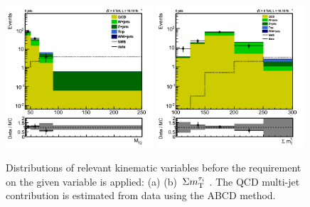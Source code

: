 \begin{figure}[htbp]
\centering
\includegraphics[width=0.49\textwidth]{QCDbginTauTau/Bin1_QCDdatadriven2.png}
\includegraphics[width=0.49\textwidth]{QCDbginTauTau/Bin2_QCDdatadriven2.png} \\
\caption{Distributions of relevant kinematic variables before the requirement on the given variable
is applied: (a) \mttwo (b) $\,\Sigma m_{\rm T}^{\tau_i}$ . The QCD multi-jet contribution is estimated from data using the ABCD method.}
\label{fig:5QCDbg}
\end{figure}


